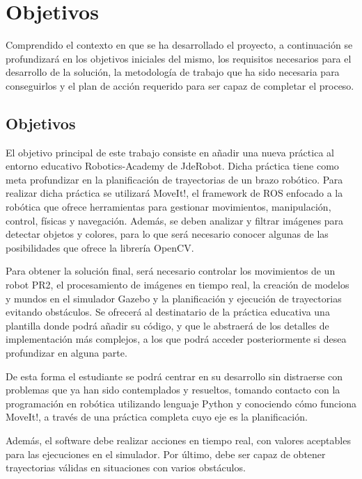 \documentclass[12pt,spanish,chapterprefix, numbers=noenddot]{book}
\numberwithin{equation}{section}
\numberwithin{figure}{section}
\begin{document}
\chapter{Objetivos}
Comprendido el contexto en que se ha desarrollado el proyecto, a continuación se
profundizará en los objetivos iniciales del mismo, los requisitos necesarios para el desarrollo de la solución, la metodología de trabajo que ha sido necesaria para conseguirlos y el plan de acción requerido para ser capaz de completar el proceso. 

\section{Objetivos}
El objetivo principal de este trabajo consiste en añadir una nueva práctica al entorno educativo Robotics-Academy de JdeRobot. Dicha práctica tiene como meta profundizar en la planificación de trayectorias de un brazo robótico. Para realizar dicha práctica se utilizará MoveIt!, el framework de ROS enfocado a la robótica que ofrece herramientas para gestionar movimientos, manipulación, control, físicas y navegación. Además, se deben analizar y filtrar imágenes para detectar objetos y colores, para lo que será necesario conocer algunas de las posibilidades que ofrece la librería OpenCV. 

Para obtener la solución final, será necesario controlar los movimientos de un robot PR2, el procesamiento de imágenes en tiempo real, la creación de modelos y mundos en el simulador Gazebo y la planificación y ejecución de trayectorias evitando obstáculos. Se ofrecerá al destinatario de la práctica educativa una plantilla donde podrá añadir su código, y que le abstraerá de los detalles de implementación más complejos, a los que podrá acceder posteriormente si desea profundizar en alguna parte. 

De esta forma el estudiante se podrá centrar en su desarrollo sin distraerse con problemas que ya han sido contemplados y resueltos, tomando contacto con la programación en robótica utilizando lenguaje Python y conociendo cómo funciona MoveIt!, a través de una práctica completa cuyo eje es la planificación.

Además, el software debe realizar acciones en tiempo real, con valores aceptables para las ejecuciones en el simulador. Por último, debe ser capaz de obtener trayectorias válidas en situaciones con varios obstáculos.
\end{document}
